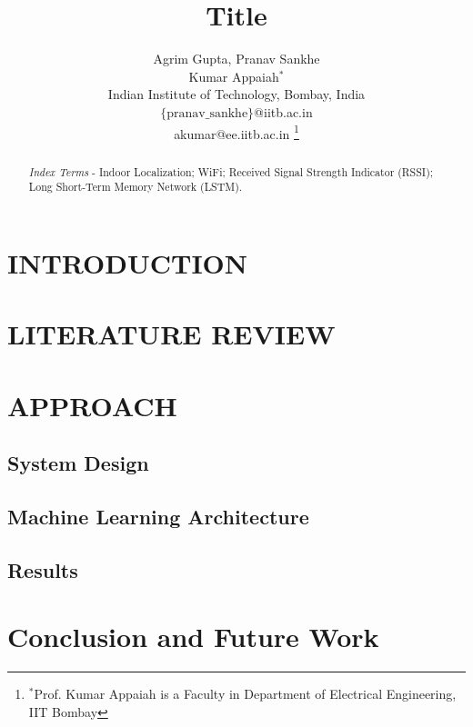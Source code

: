 \documentclass[letterpaper, 10 pt, conference]{ieeeconf}  %
\title{\LARGE \bf
Title
}
\author{Agrim Gupta, Pranav Sankhe \\ Kumar Appaiah$^{*}$ \\
Indian Institute of Technology, Bombay, India \\
$\{ \text{pranav\_sankhe}\}$@iitb.ac.in \\
akumar@ee.iitb.ac.in \hspace{1cm}
\thanks{$^{*}$Prof. Kumar Appaiah is a Faculty in Department of Electrical Engineering, IIT Bombay}%
}
\begin{document}
\maketitle
\thispagestyle{empty}
\pagestyle{empty}

\begin{abstract}


\textit{Index Terms} - Indoor Localization; WiFi; Received Signal Strength Indicator (RSSI); Long Short-Term Memory Network (LSTM).

\end{abstract}


\section{INTRODUCTION}



\section{LITERATURE REVIEW}



\section{APPROACH}

\subsection{System Design}


\subsection{Machine Learning Architecture}


\subsection{Results}
\section{Conclusion and Future Work}
\end{document}
